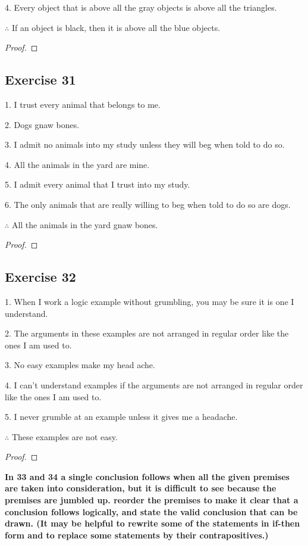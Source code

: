 \documentclass[14pt]{extarticle}
\begin{document}
4. Every object that is above all the gray objects is above all the triangles.

$\therefore$ If an object is black, then it is above all the
blue objects.

\begin{proof}

\end{proof}

\subsection{Exercise 31}
1. I trust every animal that belongs to me.

2. Dogs gnaw bones.

3. I admit no animals into my study unless they will beg when told to do so.

4. All the animals in the yard are mine.

5. I admit every animal that I trust into my study.

6. The only animals that are really willing to beg when told to do so are dogs.

$\therefore$ All the animals in the yard gnaw bones.

\begin{proof}

\end{proof}

\subsection{Exercise 32}
1. When I work a logic example without grumbling, you may be sure it is one I understand.

2. The arguments in these examples are not arranged in regular order like the ones I am used to.

3. No easy examples make my head ache.

4. I can’t understand examples if the arguments are not arranged in regular order like the ones I am used to.

5. I never grumble at an example unless it gives me a headache.

$\therefore$ These examples are not easy.

\begin{proof}

\end{proof}

{\bf \color{cyan} In 33 and 34 a single conclusion follows when all the given premises are taken into consideration, but it is difficult to see because the premises are jumbled up. reorder the premises to make it clear that a conclusion follows logically, and state the valid conclusion that can be drawn.
(It may be helpful to rewrite some of the statements in if-then form and to replace some statements by their contrapositives.)}
\end{document}
